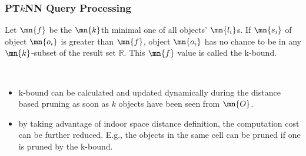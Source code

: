 
\begin{frame}
\frametitle{PT$k$NN Query Processing}

\begin{definition}[k-bound]
  \textrm{Let $\mn{f}$ be the $\mn{k}$th minimal one of all objects' $\mn{l_i}$s. If $\mn{s_i}$ of object $\mn{o_i}$ is greater than $\mn{f}$, object $\mn{o_i}$ has no chance to be in any $\mn{k}$-subset of the result set $\mathbb{R}$. This $\mn{f}$ value is called the k-bound.~\cite{cheng2009evaluating}}
\end{definition}

~\\
\begin{itemize}
  \item k-bound can be calculated and updated dynamically during the distance based pruning as soon as $k$ objects have been seen from $\mn{O}$.
  \item by taking advantage of indoor space distance definition, the computation cost can be further reduced. E.g., the objects in the same cell can be pruned if one is pruned by the k-bound.
\end{itemize}

\end{frame}



